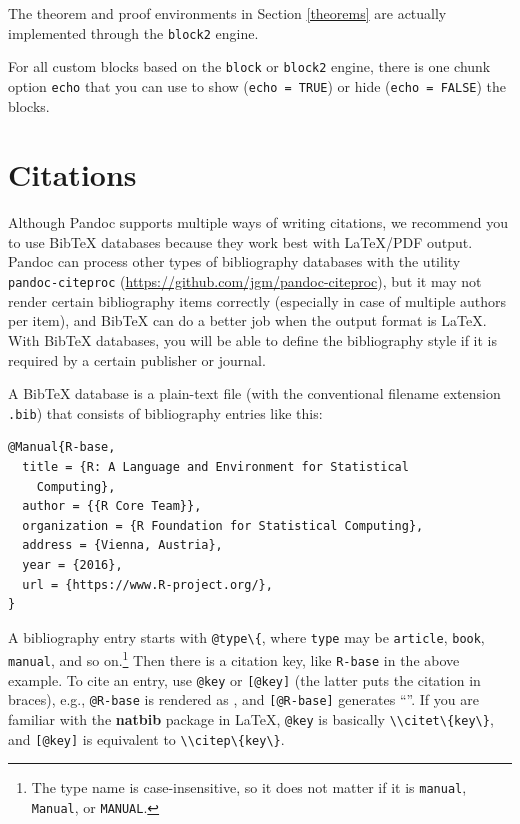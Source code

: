 \documentclass[doctor,openright,twoside]{sjtuthesis}
\newcommand{\passthrough}[1]{#1}
\theoremstyle{plain}
\theoremstyle{definition}
\theoremstyle{remark}
\theoremstyle{ocrenumbox}
\theoremstyle{plain}
\begin{document}
The theorem and proof environments in Section \ref{theorems} are actually implemented through the \passthrough{\lstinline!block2!} engine.

For all custom blocks based on the \passthrough{\lstinline!block!} or \passthrough{\lstinline!block2!} engine, there is one chunk option \passthrough{\lstinline!echo!} that you can use to show (\passthrough{\lstinline!echo = TRUE!}) or hide (\passthrough{\lstinline!echo = FALSE!}) the blocks.

\hypertarget{citations}{%
\section{Citations}\label{citations}}

Although Pandoc supports multiple ways of writing citations, we recommend you to use BibTeX databases because they work best with LaTeX/PDF output. Pandoc can process other types of bibliography databases with the utility \passthrough{\lstinline!pandoc-citeproc!} (\url{https://github.com/jgm/pandoc-citeproc}), but it may not render certain bibliography items correctly (especially in case of multiple authors per item), and BibTeX can do a better job when the output format is LaTeX. With BibTeX databases, you will be able to define the bibliography style if it is required by a certain publisher or journal.

A BibTeX database is a plain-text file (with the conventional filename extension \passthrough{\lstinline!.bib!}) that consists of bibliography entries like this:

\begin{lstlisting}
@Manual{R-base,
  title = {R: A Language and Environment for Statistical
    Computing},
  author = {{R Core Team}},
  organization = {R Foundation for Statistical Computing},
  address = {Vienna, Austria},
  year = {2016},
  url = {https://www.R-project.org/},
}
\end{lstlisting}

A bibliography entry starts with \passthrough{\lstinline!@type\{!}, where \passthrough{\lstinline!type!} may be \passthrough{\lstinline!article!}, \passthrough{\lstinline!book!}, \passthrough{\lstinline!manual!}, and so on.\footnote{The type name is case-insensitive, so it does not matter if it is \passthrough{\lstinline!manual!}, \passthrough{\lstinline!Manual!}, or \passthrough{\lstinline!MANUAL!}.} Then there is a citation key, like \passthrough{\lstinline!R-base!} in the above example. To cite an entry, use \passthrough{\lstinline!@key!} or \passthrough{\lstinline![@key]!} (the latter puts the citation in braces), e.g., \passthrough{\lstinline!@R-base!} is rendered as \textcite{R-base}, and \passthrough{\lstinline![@R-base]!} generates ``\autocite{R-base}''. If you are familiar with the \textbf{natbib} package in LaTeX, \passthrough{\lstinline!@key!} is basically \passthrough{\lstinline!\\citet\{key\}!}, and \passthrough{\lstinline![@key]!} is equivalent to \passthrough{\lstinline!\\citep\{key\}!}.
\end{document}

